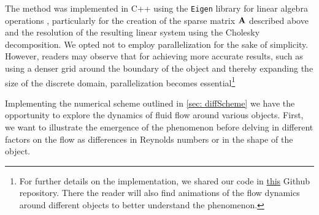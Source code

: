 The method was implemented in C++ using the \texttt{Eigen} library for linear algebra operations \cite{eigen}, particularly for the creation of the sparse matrix $\boldsymbol{\mathrm{A}}$ described above and the resolution of the resulting linear system using the Cholesky decomposition. We opted not to employ parallelization for the sake of simplicity. However, readers may observe that for achieving more accurate results, such as using a denser grid around the boundary of the object and thereby expanding the size of the discrete domain, parallelization becomes essential\footnote{For further details on the implementation, we shared our code in \href{https://github.com/victorballester7/von-karman}{this} Github repository. There the reader will also find animations of the flow dynamics around different objects to better understand the phenomenon.}

Implementing the numerical scheme outlined in \cref{sec: diffScheme} we have the opportunity to explore the dynamics of fluid flow around various objects. First, we want to illustrate the emergence of the phenomenon before delving in different factors on the flow as differences in Reynolds numbers or in the shape of the object.

